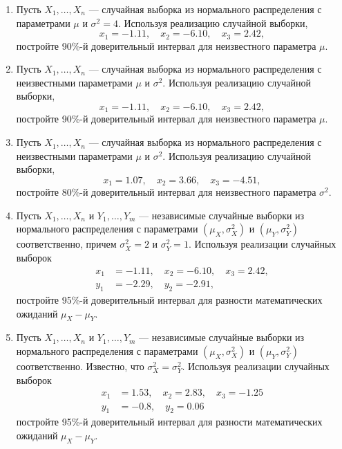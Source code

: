 \begin{enumerate}

\item Пусть $X_{1}, \ldots, X_{n}$  — случайная выборка из нормального
распределения с параметрами $\mu$ и ${\sigma}^2 = 4$.
Используя реализацию случайной выборки,
\[
x_{1} = -1.11, \quad x_{2} = -6.10, \quad x_{3} =  2.42,
\]
постройте 90\%-й доверительный интервал для неизвестного параметра $\mu$.

\item Пусть $X_{1}, \ldots, X_{n}$ — случайная выборка
из нормального распределения с неизвестными параметрами $\mu$ и ${\sigma}^2$.
Используя реализацию случайной выборки,
\[
x_{1} = -1.11, \quad x_{2} = -6.10, \quad x_{3} = 2.42,
\]
постройте 90\%-й доверительный интервал для неизвестного параметра $\mu$.

\item Пусть $X_{1}, \ldots, X_{n}$ — случайная выборка из нормального распределения
с неизвестными параметрами $\mu$ и ${\sigma}^2$.
Используя реализацию случайной выборки,
\[
x_{1} = 1.07, \quad x_{2} = 3.66, \quad x_{3} = -4.51,
\]
постройте 80\%-й доверительный интервал для неизвестного параметра ${\sigma}^2$.

\item Пусть $X_{1}, \ldots, X_{n}$ и $Y_{1}, \ldots, Y_{m}$ —
независимые случайные выборки из нормального распределения с параметрами
$(\mu_{X},{\sigma^2_{X}})$ и $(\mu_{Y},{\sigma^2_{Y}})$ соответственно,
причем $\sigma^2_{X} = 2$ и $\sigma^2_{Y} = 1$.
Используя реализации случайных выборок
\begin{align*}
x_{1} &= -1.11, \quad x_{2} = -6.10, \quad x_{3} = 2.42, \\
y_{1} &= -2.29, \quad y_{2} = -2.91,
\end{align*}
постройте 95\%-й доверительный интервал для разности математических ожиданий
$\mu_{X} - \mu_{Y}$.

\item Пусть $X_{1}, \ldots, X_{n}$ и $Y_{1}, \ldots, Y_{m}$ —
независимые случайные выборки из нормального распределения с параметрами
$(\mu_{X},{\sigma^2_{X}})$ и $(\mu_{Y},{\sigma^2_{Y}})$ соответственно.
Известно, что $\sigma^2_{X} = \sigma^2_{Y}$.
Используя реализации случайных выборок
\begin{align*}
x_{1} &= 1.53, \quad x_{2} = 2.83, \quad x_{3} = -1.25 \\
y_{1} &= -0.8, \quad y_{2} = 0.06
\end{align*}
постройте 95\%-й доверительный интервал для разности математических ожиданий
$\mu_{X} - \mu_{Y}$.


\end{enumerate}
